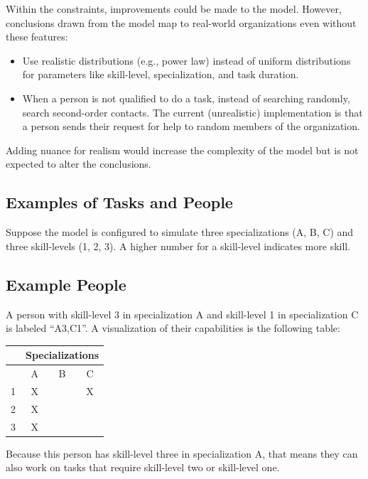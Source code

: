 Within the constraints, improvements could be made to the model. 
However,  conclusions drawn from the model map to real-world organizations even without these features: 
\begin{itemize}
    \item Use realistic distributions (e.g., power law) instead of uniform distributions for parameters like skill-level, specialization, and task duration.
    \item When a person is not qualified to do a task, instead of searching randomly, search second-order contacts. The current (unrealistic) implementation is that a person sends their request for help to random members of the organization.
\end{itemize}
Adding nuance for realism would increase the complexity of the model but is not expected to alter the conclusions.

\subsection*{Examples of Tasks and People}

Suppose the model is configured to simulate three specializations (A, B, C) and three skill-levels (1, 2, 3). A higher number for a skill-level indicates more skill.

\subsection*{Example People\label{sec:example-people}}

A person with skill-level 3 in specialization A and skill-level 1 in specialization C is labeled ``A3,C1''. A visualization of their capabilities is the following table:

\begin{center}
\begin{tabular}{c|c|c|c|}
&\multicolumn{3}{c}{\footnotesize Specializations}\\
\hline
& A & B & C \\
\hline
1 & X & & X \\
\hline
2 & X & & \\
\hline
3 & X & & \\
\hline
\end{tabular}
\end{center}

Because this person has skill-level three in specialization A, that means they can also work on tasks that require skill-level two or skill-level one.

